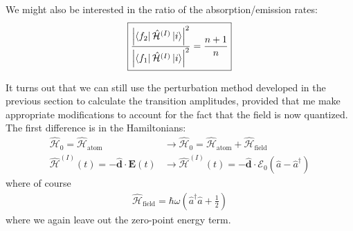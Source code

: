 \documentclass{book}
\theoremstyle{definition}
\newcommand{\ham}{\mathcal{H}}
\newcommand{\f}[2]{\frac{#1}{#2}}
\newcommand{\lp}{\left(}
\newcommand{\rp}{\right)}
\begin{document}
We might also be interested in the ratio of the absorption/emission rates:
\begin{align}\label{rates}
\boxed{\f{\abs{\bra{f_2}\hat{\ham}^{(I)}\ket{i}}^2}{\abs{\bra{f_1}\hat{\ham}^{(I)}\ket{i}}^2}= \f{n+1}{n}}
\end{align}

It turns out that we can still use the perturbation method developed in the previous section to calculate the transition amplitudes, provided that me make appropriate modifications to account for the fact that the field is now quantized. The first difference is in the Hamiltonians:
\begin{align}
\hat{\ham}_0 = \hat{\ham}_\text{atom}  &\to \hat{\ham}_0 =  \hat{\ham}_\text{atom} + \hat{\ham}_\text{field}\\
\hat{\ham}^{(I)}(t) = -\hat{\mathbf{d}}\cdot\mathbf{E}(t) &\to \hat{\ham}^{(I)}(t) = - \hat{\mathbf{d}}\cdot\bm{\mathcal{E}}_0\lp \hat{a} - \hat{a}^\dagger\rp
\end{align}
where of course
\begin{align}
\hat{\ham}_\text{field} = \hbar\omega\lp \hat{a}^\dagger\hat{a} + \f{1}{2} \rp
\end{align}
where we again leave out the zero-point energy term. \\
\end{document}
